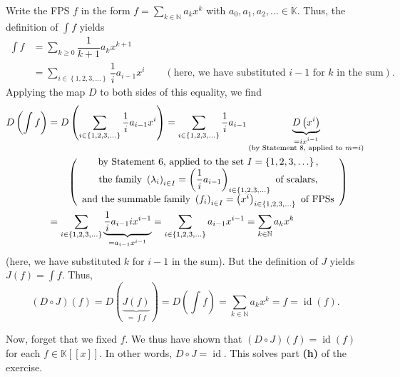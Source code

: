 \documentclass[paper=a4, fontsize=12pt]{scrartcl}%
\let\sumnonlimits\sum
\renewcommand{\sum}{\sumnonlimits\limits}
\theoremstyle{plainsl}
\theoremstyle{definition}
\theoremstyle{remark}
\begin{document}
Write the FPS $f$ in the form $f=\sum_{k\in\mathbb{N}}a_{k}x^{k}$ with
$a_{0},a_{1},a_{2},\ldots\in\mathbb{K}$. Thus, the definition of $\int f$
yields%
\begin{align*}
\int f  &  =\sum_{k\geq0}\dfrac{1}{k+1}a_{k}x^{k+1}\\
&  =\sum_{i\in\left\{  1,2,3,\ldots\right\}  }\dfrac{1}{i}a_{i-1}x^{i}%
\qquad\left(  \text{here, we have substituted }i-1\text{ for }k\text{ in the
sum}\right)  .
\end{align*}
Applying the map $D$ to both sides of this equality, we find%
\begin{align*}
D\left(  \int f\right)   &  =D\left(  \sum_{i\in\left\{  1,2,3,\ldots\right\}
}\dfrac{1}{i}a_{i-1}x^{i}\right)  =\sum_{i\in\left\{  1,2,3,\ldots\right\}
}\dfrac{1}{i}a_{i-1}\underbrace{D\left(  x^{i}\right)  }_{\substack{=ix^{i-1}%
\\\text{(by Statement 8, applied to }m=i\text{)}}}\\
&  \qquad\left(
\begin{array}
[c]{c}%
\text{by Statement 6, applied to the set }I=\left\{  1,2,3,\ldots\right\}
\text{,}\\
\text{the family }\left(  \lambda_{i}\right)  _{i\in I}=\left(  \dfrac{1}%
{i}a_{i-1}\right)  _{i\in\left\{  1,2,3,\ldots\right\}  }\text{ of scalars,}\\
\text{and the summable family }\left(  f_{i}\right)  _{i\in I}=\left(
x^{i}\right)  _{i\in\left\{  1,2,3,\ldots\right\}  }\text{ of FPSs}%
\end{array}
\right) \\
&  =\sum_{i\in\left\{  1,2,3,\ldots\right\}  }\underbrace{\dfrac{1}{i}%
a_{i-1}ix^{i-1}}_{=a_{i-1}x^{i-1}}=\sum_{i\in\left\{  1,2,3,\ldots\right\}
}a_{i-1}x^{i-1}=\sum_{k\in\mathbb{N}}a_{k}x^{k}%
\end{align*}
(here, we have substituted $k$ for $i-1$ in the sum). But the definition of
$J$ yields $J\left(  f\right)  =\int f$. Thus,%
\[
\left(  D\circ J\right)  \left(  f\right)  =D\left(  \underbrace{J\left(
f\right)  }_{=\int f}\right)  =D\left(  \int f\right)  =\sum_{k\in\mathbb{N}%
}a_{k}x^{k}=f=\operatorname*{id}\left(  f\right)  .
\]


Now, forget that we fixed $f$. We thus have shown that $\left(  D\circ
J\right)  \left(  f\right)  =\operatorname*{id}\left(  f\right)  $ for each
$f\in\mathbb{K}\left[  \left[  x\right]  \right]  $. In other words, $D\circ
J=\operatorname*{id}$. This solves part \textbf{(h)} of the exercise.

\bigskip
\end{document}
